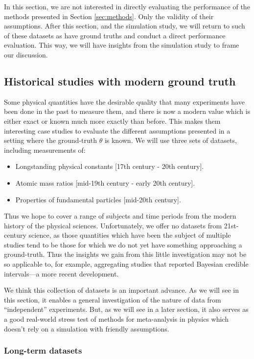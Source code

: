 \documentclass[12pt]{article}
\begin{document}
In this section, we are not interested in directly evaluating the performance of the methods presented in Section \ref{sec:methods}. Only the validity of their assumptions. After this section, and the simulation study, we will return to such of these datasets as have ground truths and conduct a direct performance evaluation. This way, we will have insights from the simulation study to frame our discussion.

\subsection{Historical studies with modern ground truth}\label{historical-studies}

Some physical quantities have the desirable quality that many experiments have been done in the past to measure them, and there is now a modern value which is either exact or known much more exactly than before. This makes them interesting case studies to evaluate the different assumptions presented in a setting where the ground-truth $\theta$ is known. We will use three sets of datasets, including measurements of:
\begin{itemize}
  \item Longstanding physical constants [17th century - 20th century].
  \item Atomic mass ratios [mid-19th century - early 20th century].
  \item Properties of fundamental particles [mid-20th century].
\end{itemize}
Thus we hope to cover a range of subjects and time periods from the modern history of the physical sciences. Unfortunately, we offer no datasets from 21st-century science, as those quantities which have been the subject of multiple studies tend to be those for which we do not yet have something approaching a ground-truth. Thus the insights we gain from this little investigation may not be so applicable to, for example, aggregating studies that reported Bayesian credible intervals---a more recent development.

We think this collection of datasets is an important advance. As we will see in this section, it enables a general investigation of the nature of data from ``independent'' experiments. But, as we will see in a later section, it also serves as a good real-world stress test of methods for meta-analysis in physics which doesn't rely on a simulation with friendly assumptions.

\subsubsection{Long-term datasets}
\end{document}
